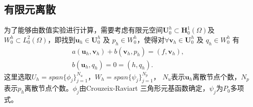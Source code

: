 \documentclass{ctexart}
\begin{document}
\subsection{有限元离散}
为了能够由数值实验进行计算，需要考虑有限元空间$\mathbf{U}_0^h \subset \mathbf{H}_0^1(\Omega)$及
$W_0^h \subset L_0^2(\Omega)$，即找到$\mathbf{u}_h \in \mathbf{U}_0^h$ 及
$p_h \in W_0^h$，使得对$\forall \mathbf{v}_h \in \mathbf{U}_0^h$ 及 $q_h \in W_0^h$ 有
\begin{gather*}
    a(\mathbf{u}_h,\mathbf{v}_h)+b(\mathbf{v}_h,p_h)=(f,\mathbf{v}_h),\\
    b(\mathbf{u}_h,q_h) =0= (h,q_h).
\end{gather*}
这里选取$U_h=span\{\phi _j\}_{j=1}^{N_u}$，$W_h=span\{\psi _j\}_{j=1}^{N_p}$，
$N_u$表示$\mathbf{u}_h$离散节点个数，$N_p$表示$p_h$离散节点个数。$\phi _j$由Crouzeix-Raviart
三角形元基函数确定，$\psi _j$为$P_0$多项式。
\end{document}
